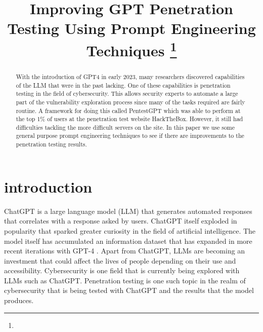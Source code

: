 \documentclass[conference]{IEEEtran}
\begin{document}
\title{Improving GPT Penetration Testing Using Prompt Engineering Techniques
\thanks{}
}
\author{
\and
{}
\and
{}
}

\maketitle

\begin{abstract}
    With the introduction of GPT4 in early 2023, many researchers discovered capabilities of the LLM that were in the past lacking. One of these capabilities is penetration testing in the field of cybersecurity. This allows security experts to automate a large part of the vulnerability exploration process since many of the tasks required are fairly routine. A framework for doing this called PentestGPT which was able to perform at the top 1\% of users at the penetration test website HackTheBox. However, it still had difficulties tackling the more difficult servers on the site. In this paper we use some general purpose prompt engineering techniques to see if there are improvements to the penetration testing results.
\end{abstract}

\section{introduction} \label{sec:intro}
ChatGPT is a large language model (LLM) that generates automated responses that correlates with a response asked by users\cite{engman2023evaluation}. ChatGPT itself exploded in popularity that sparked greater curiosity in the field of artificial intelligence. The model itself has accumulated an information dataset that has expanded in more recent iterations with GPT-4 \cite{hariri2023unlocking}. Apart from ChatGPT, LLMs are becoming an investment that could affect the lives of people depending on their use and accessibility. Cybersecurity is one field that is currently being explored with LLMs such as ChatGPT. Penetration testing is one such topic in the realm of cybersecurity that is being tested with ChatGPT and the results that the model produces.
\end{document}
